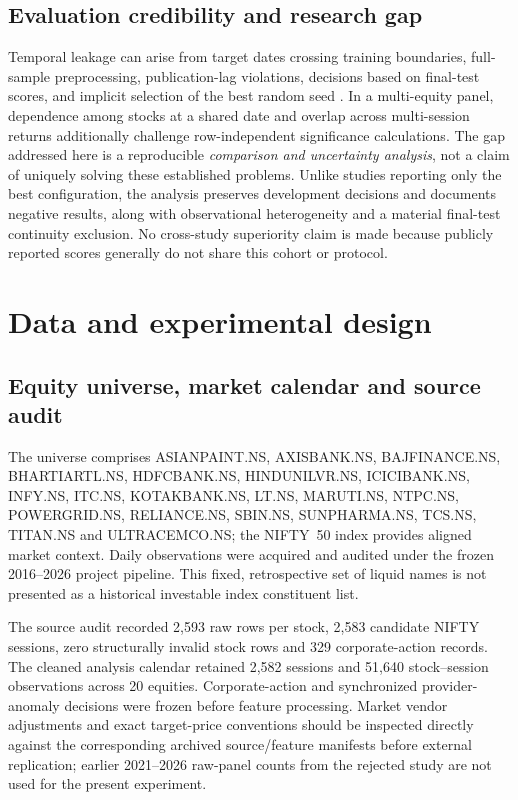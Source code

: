 \documentclass[fleqn,10pt]{wlscirep}
\begin{document}
\subsection{Evaluation credibility and research gap}
Temporal leakage can arise from target dates crossing training boundaries, full-sample preprocessing, publication-lag violations, decisions based on final-test scores, and implicit selection of the best random seed \cite{Glasserman2024LookAheadBias,Bao2026StrictChronological}. In a multi-equity panel, dependence among stocks at a shared date and overlap across multi-session returns additionally challenge row-independent significance calculations. The gap addressed here is a reproducible \emph{comparison and uncertainty analysis}, not a claim of uniquely solving these established problems. Unlike studies reporting only the best configuration, the analysis preserves development decisions and documents negative results, along with observational heterogeneity and a material final-test continuity exclusion. No cross-study superiority claim is made because publicly reported scores generally do not share this cohort or protocol.

\section{Data and experimental design}\label{sec:data}
\subsection{Equity universe, market calendar and source audit}
The universe comprises ASIANPAINT.NS, AXISBANK.NS, BAJFINANCE.NS, BHARTIARTL.NS, HDFCBANK.NS, HINDUNILVR.NS, ICICIBANK.NS, INFY.NS, ITC.NS, KOTAKBANK.NS, LT.NS, MARUTI.NS, NTPC.NS, POWERGRID.NS, RELIANCE.NS, SBIN.NS, SUNPHARMA.NS, TCS.NS, TITAN.NS and ULTRACEMCO.NS; the NIFTY~50 index provides aligned market context. Daily observations were acquired and audited under the frozen 2016--2026 project pipeline. This fixed, retrospective set of liquid names is not presented as a historical investable index constituent list.

The source audit recorded 2,593 raw rows per stock, 2,583 candidate NIFTY sessions, zero structurally invalid stock rows and 329 corporate-action records. The cleaned analysis calendar retained 2,582 sessions and 51,640 stock--session observations across 20 equities. Corporate-action and synchronized provider-anomaly decisions were frozen before feature processing. Market vendor adjustments and exact target-price conventions should be inspected directly against the corresponding archived source/feature manifests before external replication; earlier 2021--2026 raw-panel counts from the rejected study are not used for the present experiment.
\end{document}
